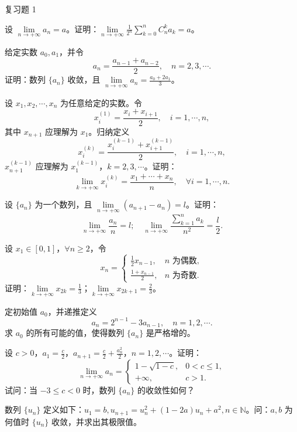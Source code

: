 \begin{exblock}{复习题 1}
    \item 设 $\lim\limits_{n\to+\infty} a_n = a$。证明：$\lim\limits_{n\to+\infty} \frac{1}{2^n} \sum\limits_{k=0}^n C_n^k a_k = a$。

    \item 给定实数 $a_0, a_1$，并令
    \[
    a_n = \frac{a_{n-1} + a_{n-2}}{2},\quad n = 2, 3, \cdots.
\]
    证明：数列 $\{a_n\}$ 收敛，且 $\lim\limits_{n\to+\infty} a_n = \frac{a_0 + 2a_1}{3}$。

    \item 设 $x_1, x_2, \cdots, x_n$ 为任意给定的实数。令
    \[
    x_i^{(1)} = \frac{x_i + x_{i+1}}{2},\quad i = 1, \cdots, n,
\]
    其中 $x_{n+1}$ 应理解为 $x_1$。归纳定义
    \[
    x_i^{(k)} = \frac{x_i^{(k-1)} + x_{i+1}^{(k-1)}}{2},\quad i = 1, \cdots, n,
\]
    $x_{n+1}^{(k-1)}$ 应理解为 $x_1^{(k-1)}$，$k = 2, 3, \cdots$。证明：
    \[
    \lim_{k\to+\infty} x_i^{(k)} = \frac{x_1 + \cdots + x_n}{n},\quad \forall i = 1, \cdots, n.
\]

    \item 设 $\{a_n\}$ 为一个数列，且 $\lim\limits_{n\to+\infty} (a_{n+1} - a_n) = l$。证明：
    \[
    \lim_{n\to+\infty} \frac{a_n}{n} = l;\quad \lim_{n\to+\infty} \frac{\sum\limits_{k=1}^n a_k}{n^2} = \frac{l}{2}.
\]

    \item 设 $x_1 \in [0, 1]$，$\forall n \geqslant 2$，令
    \[
    x_n = \begin{cases} \frac{1}{2} x_{n-1}, & n \text{ 为偶数},\\ \frac{1 + x_{n-1}}{2}, & n \text{ 为奇数}. \end{cases}
\]
    证明：$\lim\limits_{k\to+\infty} x_{2k} = \frac{1}{3}$；$\lim\limits_{k\to+\infty} x_{2k+1} = \frac{2}{3}$。

    \item 定初始值 $a_0$，并递推定义
    \[
    a_n = 2^{n-1} - 3a_{n-1},\quad n = 1, 2, \cdots.
\]
    求 $a_0$ 的所有可能的值，使得数列 $\{a_n\}$ 是严格增的。

    \item 设 $c > 0$，$a_1 = \frac{c}{2}$，$a_{n+1} = \frac{c}{2} + \frac{a_n^2}{2}$，$n = 1, 2, \cdots$。证明：
    \[
    \lim_{n\to+\infty} a_n = \begin{cases} 1 - \sqrt{1 - c}, & 0 < c \leqslant 1,\\ +\infty, & c > 1. \end{cases}
\]
    试问：当 $-3 \leqslant c < 0$ 时，数列 $\{a_n\}$ 的收敛性如何？

    \item 数列 $\{u_n\}$ 定义如下：$u_1 = b, u_{n+1} = u_n^2 + (1 - 2a)u_n + a^2, n \in \mathbb{N}$。问：$a, b$ 为何值时 $\{u_n\}$ 收敛，并求出其极限值。


\end{exblock}
